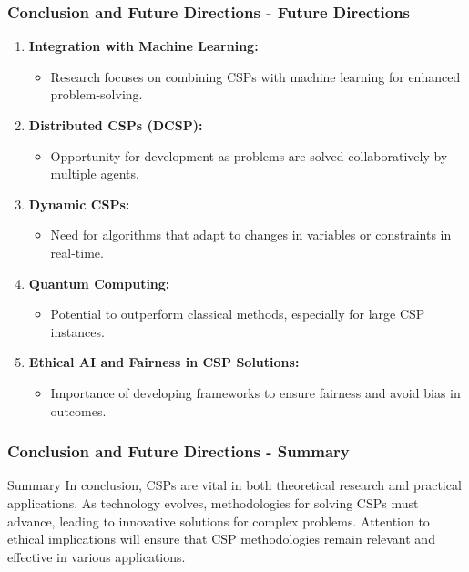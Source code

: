 \documentclass[aspectratio=169]{beamer}
\begin{document}
\begin{frame}[fragile]
    \frametitle{Conclusion and Future Directions - Future Directions}
    
    \begin{enumerate}
        \item \textbf{Integration with Machine Learning:}
            \begin{itemize}
                \item Research focuses on combining CSPs with machine learning for enhanced problem-solving.
            \end{itemize}
        
        \item \textbf{Distributed CSPs (DCSP):}
            \begin{itemize}
                \item Opportunity for development as problems are solved collaboratively by multiple agents.
            \end{itemize}
        
        \item \textbf{Dynamic CSPs:}
            \begin{itemize}
                \item Need for algorithms that adapt to changes in variables or constraints in real-time.
            \end{itemize}
        
        \item \textbf{Quantum Computing:}
            \begin{itemize}
                \item Potential to outperform classical methods, especially for large CSP instances.
            \end{itemize}
        
        \item \textbf{Ethical AI and Fairness in CSP Solutions:}
            \begin{itemize}
                \item Importance of developing frameworks to ensure fairness and avoid bias in outcomes.
            \end{itemize}
    \end{enumerate}
\end{frame}

\begin{frame}[fragile]
    \frametitle{Conclusion and Future Directions - Summary}
    
    \begin{block}{Summary}
        In conclusion, CSPs are vital in both theoretical research and practical applications. 
        As technology evolves, methodologies for solving CSPs must advance, leading to innovative solutions for complex problems. 
        Attention to ethical implications will ensure that CSP methodologies remain relevant and effective in various applications.
    \end{block}
\end{frame}
\end{document}
